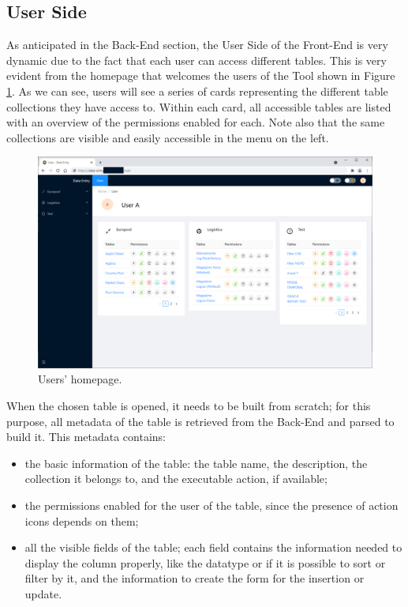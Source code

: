 \clearpage
\subsection*{User Side}
As anticipated in the Back-End section, the User Side of the Front-End is very dynamic due to the fact that each user can access different tables. This is very evident from the homepage that welcomes the users of the Tool shown in Figure \ref{fig:home}. As we can see, users will see a series of cards representing the different table collections they have access to. Within each card, all accessible tables are listed with an overview of the permissions enabled for each. Note also that the same collections are visible and easily accessible in the menu on the left. 

\begin{figure}[!htb]
    \centering
    \includegraphics[width=15.8cm]{chapters/images/ch_3/FE/User/home_user.png}
    \caption{Users' homepage.}
    \label{fig:home}
\end{figure}

When the chosen table is opened, it needs to be built from scratch; for this purpose, all metadata of the table is retrieved from the Back-End and parsed to build it. This metadata contains:
\begin{itemize}
    \item the basic information of the table: the table name, the description, the collection it belongs to, and the executable action, if available;
    \item the permissions enabled for the user of the table, since the presence of action icons depends on them;
    \item all the visible fields of the table; each field contains the information needed to display the column properly, like the datatype or if it is possible to sort or filter by it, and the information to create the form for the insertion or update.
\end{itemize}

